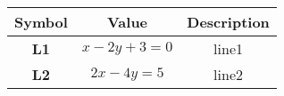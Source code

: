 \begin{tabular}[12pt]{ |c|c|c|}
    \hline
    \textbf{Symbol} & \textbf{Value} & \textbf{Description} \\
    \hline
    \textbf{L1} & $x-2y+3=0$ & line1\\
    \hline
    \textbf{L2} & $2x-4y=5$ & line2\\
    \hline
    \end{tabular}
